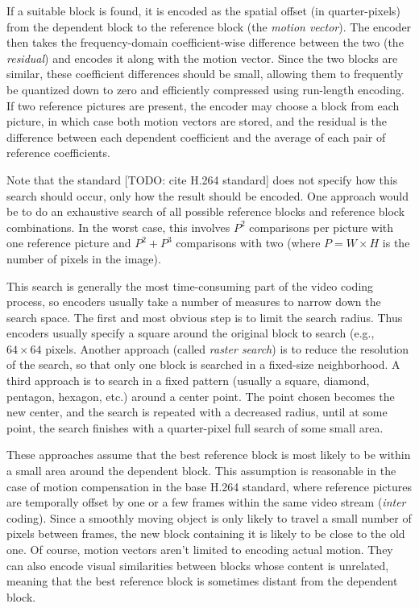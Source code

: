 \documentclass[twoside, 11pt]{article}
\begin{document}
If a suitable block is found, it is encoded as the spatial offset (in
quarter-pixels) from the dependent block to the reference block (the {\it motion
vector}). The encoder then takes the frequency-domain coefficient-wise
difference between the two (the {\it residual}) and encodes it along with the
motion vector. Since the two blocks are similar, these coefficient differences
should be small, allowing them to frequently be quantized down to zero and
efficiently compressed using run-length encoding. If two reference pictures are
present, the encoder may choose a block from each picture, in which case both
motion vectors are stored, and the residual is the difference between each
dependent coefficient and the average of each pair of reference coefficients.

Note that the standard [TODO: cite H.264 standard] does not specify how this
search should occur, only how the result should be encoded. One approach would
be to do an exhaustive search of all possible reference blocks and reference
block combinations. In the worst case, this involves $P^2$ comparisons per
picture with one reference picture and $P^2 + P^3$ comparisons with two (where
$P = W\times H$ is the number of pixels in the image).

This search is generally the most time-consuming part of the video coding
process, so encoders usually take a number of measures to narrow down the search
space. The first and most obvious step is to limit the search radius. Thus
encoders usually specify a square around the original block to search (e.g.,
$64\times 64$ pixels. Another approach (called {\it raster search}) is to reduce
the resolution of the search, so that only one block is searched in a fixed-size
neighborhood. A third approach is to search in a fixed pattern (usually a
square, diamond, pentagon, hexagon, etc.) around a center point. The point
chosen becomes the new center, and the search is repeated with a decreased
radius, until at some point, the search finishes with a quarter-pixel full
search of some small area.

These approaches assume that the best reference block is most likely to be
within a small area around the dependent block. This assumption is reasonable
in the case of motion compensation in the base H.264 standard, where reference
pictures are temporally offset by one or a few frames within the same video
stream ({\it inter} coding). Since a smoothly moving object is only likely to
travel a small number of pixels between frames, the new block containing it is
likely to be close to the old one. Of course, motion vectors aren't limited to
encoding actual motion. They can also encode visual similarities between blocks
whose content is unrelated, meaning that the best reference block is sometimes
distant from the dependent block.
\end{document}
